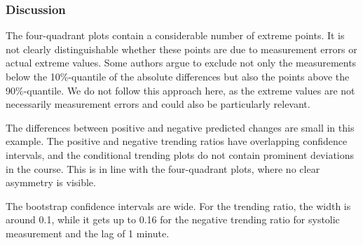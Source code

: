 \subsubsection*{Discussion}

The four-quadrant plots contain a considerable number of extreme points.
It is not clearly distinguishable whether these points are due to measurement errors or actual extreme values.
Some authors argue to exclude not only the measurements below the 10\%-quantile of the absolute differences but also the points above the 90\%-quantile.
We do not follow this approach here, as the extreme values are not necessarily measurement errors and could also be particularly relevant.

The differences between positive and negative predicted changes are small in this example.
The positive and negative trending ratios have overlapping confidence intervals, and the conditional trending plots do not contain prominent deviations in the course.
This is in line with the four-quadrant plots, where no clear asymmetry is visible.

The bootstrap confidence intervals are wide.
For the trending ratio, the width is around 0.1, while it gets up to 0.16 for the negative trending ratio for systolic measurement and the lag of 1 minute.


